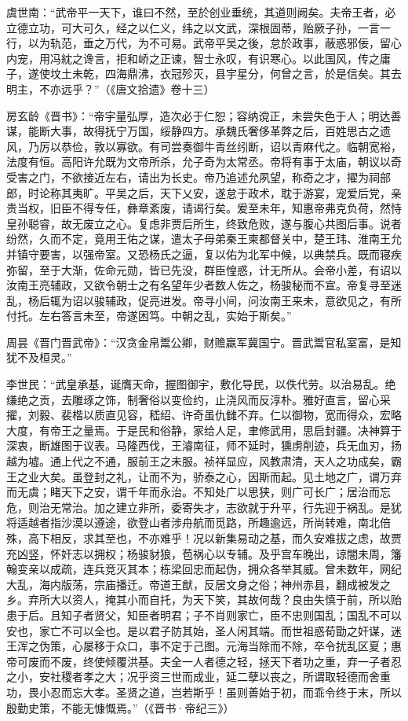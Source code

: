虞世南：“武帝平一天下，谁曰不然，至於创业垂统，其道则阙矣。夫帝王者，必立德立功，可大可久，经之以仁义，纬之以文武，深根固蒂，贻厥子孙，一言一行，以为轨范，垂之万代，为不可易。武帝平吴之後，怠於政事，蔽惑邪佞，留心内宠，用冯紞之谗言，拒和峤之正谏，智士永叹，有识寒心。以此国风，传之庸子，遂使坟土未乾，四海鼎沸，衣冠殄灭，县宇星分，何曾之言，於是信矣。其去明主，不亦远乎？”（《唐文拾遗》卷十三）

房玄龄《晋书》：“帝宇量弘厚，造次必于仁恕；容纳谠正，未尝失色于人；明达善谋，能断大事，故得抚宁万国，绥静四方。承魏氏奢侈革弊之后，百姓思古之遗风，乃厉以恭俭，敦以寡欲。有司尝奏御牛青丝纼断，诏以青麻代之。临朝宽裕，法度有恒。高阳许允既为文帝所杀，允子奇为太常丞。帝将有事于太庙，朝议以奇受害之门，不欲接近左右，请出为长史。帝乃追述允夙望，称奇之才，擢为祠部郎，时论称其夷旷。平吴之后，天下乂安，遂怠于政术，耽于游宴，宠爱后党，亲贵当权，旧臣不得专任，彝章紊废，请谒行矣。爰至未年，知惠帝弗克负荷，然恃皇孙聪睿，故无废立之心。复虑非贾后所生，终致危败，遂与腹心共图后事。说者纷然，久而不定，竟用王佑之谋，遣太子母弟秦王柬都督关中，楚王玮、淮南王允并镇守要害，以强帝室。又恐杨氏之逼，复以佑为北军中候，以典禁兵。既而寝疾弥留，至于大渐，佐命元勋，皆已先没，群臣惶惑，计无所从。会帝小差，有诏以汝南王亮辅政，又欲令朝士之有名望年少者数人佐之，杨骏秘而不宣。帝复寻至迷乱，杨后辄为诏以骏辅政，促亮进发。帝寻小间，问汝南王来未，意欲见之，有所付托。左右答言未至，帝遂困笃。中朝之乱，实始于斯矣。”

周昙《晋门晋武帝》：“汉贪金帛鬻公卿，财赡羸军冀国宁。晋武鬻官私室富，是知犹不及桓灵。”

李世民：“武皇承基，诞膺天命，握图御宇，敷化导民，以佚代劳。以治易乱。绝缣绝之贡，去雕琢之饰，制奢俗以变俭约，止浇风而反淳朴。雅好直言，留心采擢，刘毅、裴楷以质直见容，嵇绍、许奇虽仇雠不弃。仁以御物，宽而得众，宏略大度，有帝王之量焉。于是民和俗静，家给人足，聿修武用，思启封疆。决神算于深衷，断雄图于议表。马隆西伐，王濬南征，师不延时，獯虏削迹，兵无血刃，扬越为墟。通上代之不通，服前王之未服。祯祥显应，风教肃清，天人之功成矣，霸王之业大矣。虽登封之礼，让而不为，骄泰之心，因斯而起。见土地之广，谓万弃而无虞；睹天下之安，谓千年而永治。不知处广以思狭，则广可长广；居治而忘危，则治无常治。加之建立非所，委寄失才，志欲就于升平，行先迎于祸乱。是犹将适越者指沙漠以遵途，欲登山者涉舟航而觅路，所趣逾远，所尚转难，南北倍殊，高下相反，求其至也，不亦难乎！况以新集易动之基，而久安难拔之虑，故贾充凶竖，怀奸志以拥权；杨骏豺狼，苞祸心以专辅。及乎宫车晚出，谅闇未周，籓翰变亲以成疏，连兵竞灭其本；栋梁回忠而起伪，拥众各举其威。曾未数年，网纪大乱，海内版荡，宗庙播迁。帝道王猷，反居文身之俗；神州赤县，翻成被发之乡。弃所大以资人，掩其小而自托，为天下笑，其故何哉？良由失慎于前，所以贻患于后。且知子者贤父，知臣者明君；子不肖则家亡，臣不忠则国乱；国乱不可以安也，家亡不可以全也。是以君子防其始，圣人闲其端。而世祖惑荀勖之奸谋，迷王浑之伪策，心屡移于众口，事不定于己图。元海当除而不除，卒令扰乱区夏；惠帝可废而不废，终使倾覆洪基。夫全一人者德之轻，拯天下者功之重，弃一子者忍之小，安社稷者孝之大；况乎资三世而成业，延二孽以丧之，所谓取轻德而舍重功，畏小忍而忘大孝。圣贤之道，岂若斯乎！虽则善始于初，而乖令终于末，所以殷勤史策，不能无慷慨焉。”（《晋书·帝纪三》）

